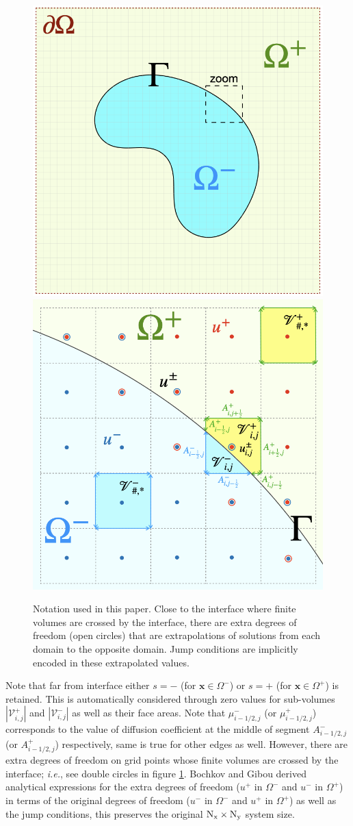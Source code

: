 \documentclass{elsarticle}
\begin{document}
\begin{figure}
	\centering
	\includegraphics[width=0.45\linewidth]{./figures/grids_full.png}
	\includegraphics[width=0.45\linewidth]{./figures/grids.png}
	\caption{Notation used in this paper. Close to the interface where finite volumes are crossed by the interface, there are extra degrees of freedom (open circles) that are extrapolations of solutions from each domain to the opposite domain. Jump conditions are implicitly encoded in these extrapolated values.}
	\label{fig:grid}
\end{figure}

Note that far from interface either $s=-$ (for $\mathbf{x}\in \Omega^-$) or $s=+$ (for $\mathbf{x}\in \Omega^+$) is retained. This is automatically considered through zero values for sub-volumes $|\mathcal{V}_{i,j}^+|$ and $|\mathcal{V}_{i,j}^-|$ as well as their face areas. Note that $\mu_{i-1/2,j}^-$ (or $\mu_{i-1/2,j}^+$) corresponds to the value of diffusion coefficient at the middle of segment $A^-_{i-1/2,j}$ (or $A^+_{i-1/2,j}$) respectively, same is true for other edges as well. However, there are extra degrees of freedom on grid points whose finite volumes are crossed by the interface; \textit{i.e.}, see double circles in figure \ref{fig:grid}. Bochkov and Gibou derived analytical expressions for the extra degrees of freedom ($u^+$ in $\Omega^-$ and $u^-$ in $\Omega^+$) in terms of the original degrees of freedom ($u^-$ in $\Omega^-$ and $u^+$ in $\Omega^+$) as well as the jump conditions, this preserves the original $\rm N_x \times N_y$ system size.
\end{document}
